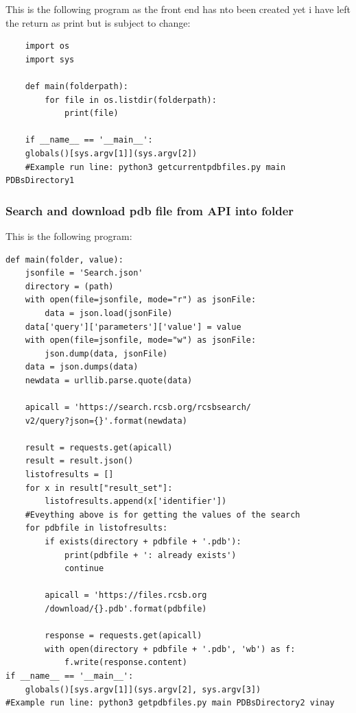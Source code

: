 \documentclass[]{final_report}
\begin{document}
This is the following program as the front end has nto been created yet i have left the return as print but is subject to change:

\begin{lstlisting}
    import os
    import sys

    def main(folderpath):
        for file in os.listdir(folderpath):
            print(file)

    if __name__ == '__main__':
    globals()[sys.argv[1]](sys.argv[2])
    #Example run line: python3 getcurrentpdbfiles.py main PDBsDirectory1

\end{lstlisting}

\subsubsection{Search and download pdb file from API into folder}

This is the following program:

\begin{lstlisting}
def main(folder, value):
    jsonfile = 'Search.json'
    directory = (path)
    with open(file=jsonfile, mode="r") as jsonFile:
        data = json.load(jsonFile)
    data['query']['parameters']['value'] = value
    with open(file=jsonfile, mode="w") as jsonFile:
        json.dump(data, jsonFile)
    data = json.dumps(data)
    newdata = urllib.parse.quote(data)

    apicall = 'https://search.rcsb.org/rcsbsearch/
    v2/query?json={}'.format(newdata)

    result = requests.get(apicall)
    result = result.json()
    listofresults = []
    for x in result["result_set"]:
        listofresults.append(x['identifier'])
    #Eveything above is for getting the values of the search
    for pdbfile in listofresults:
        if exists(directory + pdbfile + '.pdb'):
            print(pdbfile + ': already exists')
            continue

        apicall = 'https://files.rcsb.org
        /download/{}.pdb'.format(pdbfile)

        response = requests.get(apicall)
        with open(directory + pdbfile + '.pdb', 'wb') as f:
            f.write(response.content)
if __name__ == '__main__':
    globals()[sys.argv[1]](sys.argv[2], sys.argv[3])
#Example run line: python3 getpdbfiles.py main PDBsDirectory2 vinay
\end{lstlisting}
\end{document}
